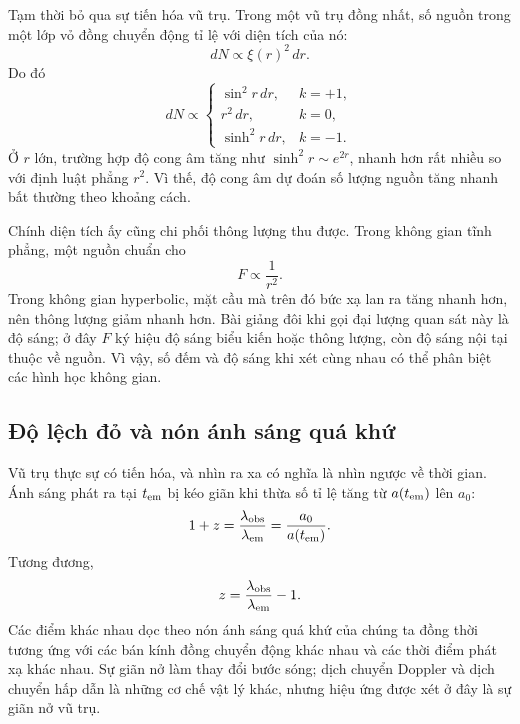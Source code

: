 Tạm thời bỏ qua sự tiến hóa vũ trụ. Trong một vũ trụ đồng nhất, số nguồn trong một lớp vỏ đồng chuyển động tỉ lệ với diện tích của nó:
\begin{equation}
dN\propto \xi(r)^2\,dr.
\label{eq:c06-shell-count}
\end{equation}
Do đó
\begin{equation}
dN\propto
\begin{cases}
\sin^2r\,dr, & k=+1,\\
r^2\,dr, & k=0,\\
\sinh^2r\,dr, & k=-1.
\end{cases}
\end{equation}
Ở \(r\) lớn, trường hợp độ cong âm tăng như \(\sinh^2r\sim e^{2r}\), nhanh hơn rất nhiều so với định luật phẳng \(r^2\). Vì thế, độ cong âm dự đoán số lượng nguồn tăng nhanh bất thường theo khoảng cách.

Chính diện tích ấy cũng chi phối thông lượng thu được. Trong không gian tĩnh phẳng, một nguồn chuẩn cho
\begin{equation}
F\propto\frac{1}{r^2}.
\end{equation}
Trong không gian hyperbolic, mặt cầu mà trên đó bức xạ lan ra tăng nhanh hơn, nên thông lượng giảm nhanh hơn. Bài giảng đôi khi gọi đại lượng quan sát này là độ sáng; ở đây \(F\) ký hiệu độ sáng biểu kiến hoặc thông lượng, còn độ sáng nội tại thuộc về nguồn. Vì vậy, số đếm và độ sáng khi xét cùng nhau có thể phân biệt các hình học không gian.

\subsection{Độ lệch đỏ và nón ánh sáng quá khứ}

Vũ trụ thực sự có tiến hóa, và nhìn ra xa có nghĩa là nhìn ngược về thời gian. Ánh sáng phát ra tại \(t_{\rm em}\) bị kéo giãn khi thừa số tỉ lệ tăng từ \(a(t_{\rm em})\) lên \(a_0\):
\begin{equation}
1+z
=\frac{\lambda_{\rm obs}}{\lambda_{\rm em}}
=\frac{a_0}{a(t_{\rm em})}.
\label{eq:c06-redshift}
\end{equation}
Tương đương,
\begin{equation}
z=\frac{\lambda_{\rm obs}}{\lambda_{\rm em}}-1.
\end{equation}
Các điểm khác nhau dọc theo nón ánh sáng quá khứ của chúng ta đồng thời tương ứng với các bán kính đồng chuyển động khác nhau và các thời điểm phát xạ khác nhau. Sự giãn nở làm thay đổi bước sóng; dịch chuyển Doppler và dịch chuyển hấp dẫn là những cơ chế vật lý khác, nhưng hiệu ứng được xét ở đây là sự giãn nở vũ trụ.

